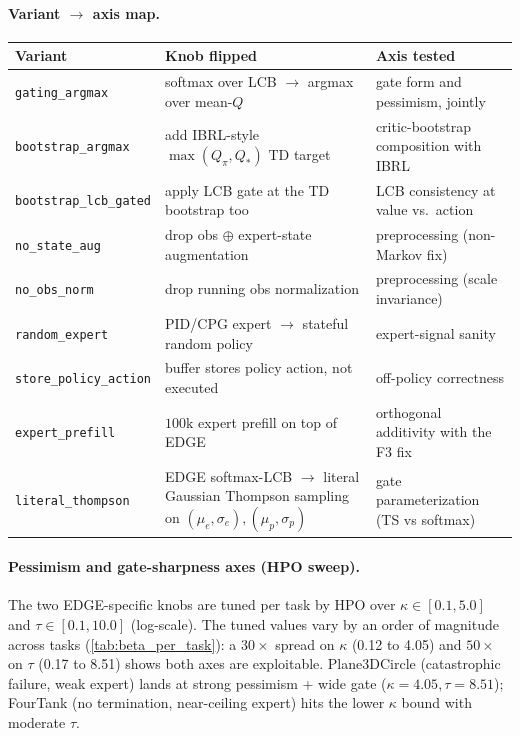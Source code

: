 \documentclass{article}
\begin{document}
\paragraph{Variant $\to$ axis map.}
\begin{center}
\small
\begin{tabular}{lll}
\toprule
\textbf{Variant} & \textbf{Knob flipped} & \textbf{Axis tested} \\
\midrule
\texttt{gating\_argmax}        & softmax over LCB $\to$ argmax over mean-$Q$ & gate form and pessimism, jointly \\
\texttt{bootstrap\_argmax}     & add IBRL-style $\max(Q_\pi, Q_*)$ TD target & critic-bootstrap composition with IBRL \\
\texttt{bootstrap\_lcb\_gated} & apply LCB gate at the TD bootstrap too      & LCB consistency at value vs.\ action \\
\texttt{no\_state\_aug}        & drop obs $\oplus$ expert-state augmentation & preprocessing (non-Markov fix) \\
\texttt{no\_obs\_norm}         & drop running obs normalization              & preprocessing (scale invariance) \\
\texttt{random\_expert}        & PID/CPG expert $\to$ stateful random policy & expert-signal sanity \\
\texttt{store\_policy\_action} & buffer stores policy action, not executed   & off-policy correctness \\
\texttt{expert\_prefill}       & $100\mathrm{k}$ expert prefill on top of EDGE & orthogonal additivity with the F3 fix \\
\texttt{literal\_thompson}     & EDGE softmax-LCB $\to$ literal Gaussian Thompson sampling on $(\mu_e,\sigma_e),(\mu_p,\sigma_p)$ & gate parameterization (TS vs softmax) \\
\bottomrule
\end{tabular}
\end{center}

\paragraph{Pessimism and gate-sharpness axes (HPO sweep).}
The two EDGE-specific knobs are tuned per task by HPO over
$\kappa \in [0.1, 5.0]$ and $\tau \in [0.1, 10.0]$ (log-scale). The
tuned values vary by an order of magnitude across tasks
(\cref{tab:beta_per_task}): a $30\times$ spread on $\kappa$
(0.12 to 4.05) and $50\times$ on $\tau$ (0.17 to 8.51) shows both
axes are exploitable. Plane3DCircle (catastrophic failure, weak
expert) lands at strong pessimism + wide gate ($\kappa\!=\!4.05,
\tau\!=\!8.51$); FourTank (no termination, near-ceiling expert) hits
the lower $\kappa$ bound with moderate $\tau$.
\end{document}
